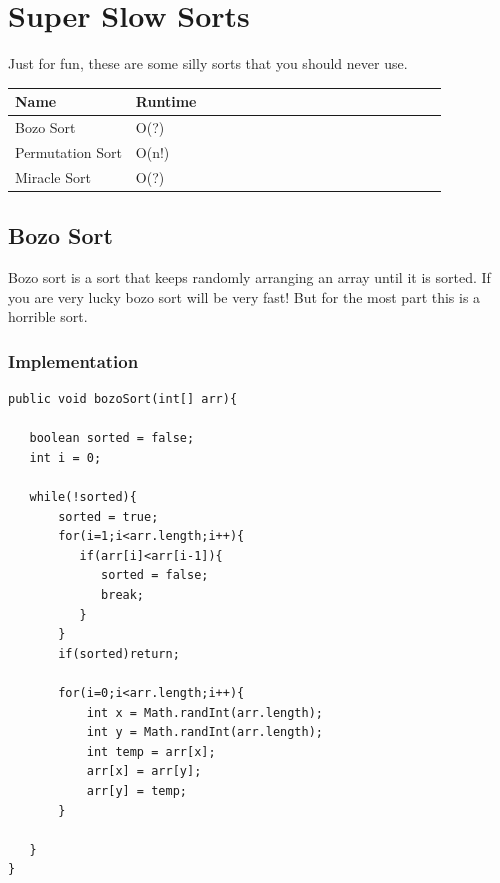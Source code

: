 \documentclass[11pt,oneside]{book}
\begin{document}
    \chapter{ Super Slow Sorts }
        

Just for fun, these are some silly sorts that you should never use.

\vspace{10px}\begin{tabulary}{0.4\linewidth}{|l|l|l|l|l|l|l|l|l|l|l|l|l|l|l|l|l|l|l}\hline


  Name &
  Runtime\\
\hline


  Bozo Sort &
  O(?)\\

  Permutation Sort &
  O(n!)\\

  Miracle Sort &
  O(?)\\

\hline\end{tabulary}


        \section{ Bozo Sort }
        

Bozo sort is a sort that keeps randomly arranging an array until it is sorted. If you are very lucky bozo sort will be very fast! But for the most part this is a horrible sort.

\subsection{Implementation}

\begin{lstlisting}
public void bozoSort(int[] arr){
   
   boolean sorted = false;
   int i = 0;

   while(!sorted){
       sorted = true;
       for(i=1;i<arr.length;i++){
          if(arr[i]<arr[i-1]){
             sorted = false;
             break;
          }
       }
       if(sorted)return;

       for(i=0;i<arr.length;i++){
           int x = Math.randInt(arr.length);
           int y = Math.randInt(arr.length);
           int temp = arr[x];
           arr[x] = arr[y];
           arr[y] = temp;
       }

   }
}

\end{lstlisting}
\end{document}
